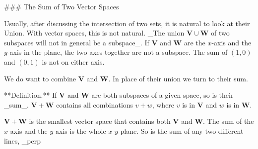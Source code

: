

### The Sum of Two Vector Spaces

Usually, after discussing the intersection of two sets, it is natural to look at their Union. With vector spaces, this is not natural. _The union \(\mathbf{V}\cup\mathbf{W}\) of two subspaces will not in general be a subspace_. If \(\mathbf{V}\) and \(\mathbf{W}\) are the \(x\)-axis and the \(y\)-axis in the plane, the two axes together are not a subspace. The sum of \((1,0)\) and \((0,1)\) is not on either axis.

We do want to combine \(\mathbf{V}\) and \(\mathbf{W}\). In place of their union we turn to their sum.

**Definition.** If \(\mathbf{V}\) and \(\mathbf{W}\) are both subspaces of a given space, so is their _sum_. \(\mathbf{V}+\mathbf{W}\) contains all combinations \(v+w\), where \(v\) is in \(\mathbf{V}\) and \(w\) is in \(\mathbf{W}\).

\(\mathbf{V}+\mathbf{W}\) is the smallest vector space that contains both \(\mathbf{V}\) and \(\mathbf{W}\). The sum of the \(x\)-axis and the \(y\)-axis is the whole \(x\)-\(y\) plane. So is the sum of any two different lines, _perp